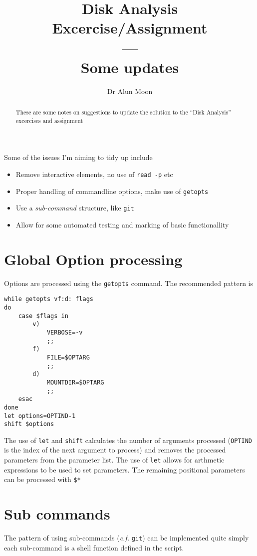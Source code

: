 \documentclass[12pt]{article}
\title{Disk Analysis Excercise/Assignment \\---\\ Some updates}
\author{Dr Alun Moon}
\begin{document}
\maketitle

\begin{abstract}
	These are some notes on suggestions to update the solution to the 
	``Disk Analysis'' excercises and assignment
\end{abstract}

Some of the issues I'm aiming to tidy up include
\begin{itemize}
	\item Remove interactive elements, no use of \verb:read -p: etc
	\item Proper handling of commandline options, make use of \verb:getopts:
	\item Use a \emph{sub-command} structure, like \verb:git:
	\item Allow for some automated testing and marking of basic functionallity
\end{itemize}

\section{Global Option processing}
Options are processed using the \verb:getopts: command.  The recommended pattern is 
\begin{tcolorbox}[title=\texttt{getopts} handling]
\begin{verbatim}
while getopts vf:d: flags
do
    case $flags in
        v)
            VERBOSE=-v
            ;;
        f)
            FILE=$OPTARG
            ;;
        d)
            MOUNTDIR=$OPTARG
            ;;
    esac
done
let options=OPTIND-1
shift $options
\end{verbatim}
\end{tcolorbox}
The use of \verb:let: and \verb:shift: calculates the number of arguments processed 
(\verb:OPTIND: is the index of the next argument to process)
and removes the processed parameters from the parameter list.
The use of \verb:let: allows for arthmetic expressions to be used to set parameters.
The remaining positional parameters can be processed with \verb:$*:

\section{Sub commands}
The pattern of using sub-commands (\textit{c.f.} \verb:git:) can be implemented quite simply
each sub-command is a shell function defined in the script.
\end{document}
